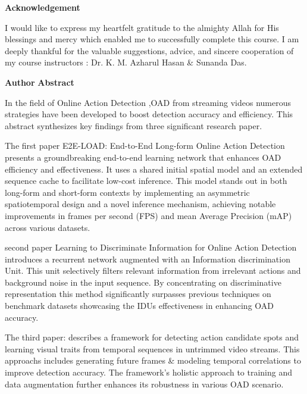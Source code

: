 \documentclass[12pt]{article}
\begin{document}
\begin{titlepage}
\begin{center}
{    {\fontsize{16}{1.5}\selectfont \textbf{Acknowledgement}}\\
    \vspace{12pt}
    \vspace{12pt}
    \begin{flushleft}
        \justifying  I would like to express my heartfelt gratitude to the almighty Allah for His blessings and
mercy which enabled me to successfully complete this course. I am deeply thankful for the
valuable suggestions, advice, and sincere cooperation of my course instructors : Dr. K. M.
Azharul Hasan \& Sunanda Das.
    \end{flushleft}
    {\fontsize{12}{1.5}\selectfont \hfill \textbf{Author}}
    \clearpage
    {\fontsize{16}{1.5}\selectfont \textbf{Abstract}}\\
    \vspace{12pt}
    \vspace{12pt}
    \begin{flushleft}
       
In the field of Online Action Detection ,OAD from streaming videos numerous strategies
have been developed to boost detection accuracy and efficiency. This abstract synthesizes
key findings from three significant research paper.
    \vspace{12pt}

The first paper E2E-LOAD: End-to-End Long-form Online Action Detection  presents a
groundbreaking end-to-end learning network that enhances OAD efficiency and
effectiveness. It uses a shared initial spatial model and an extended sequence cache to
facilitate low-cost inference. This model stands out in both long-form and short-form
contexts by implementing an asymmetric spatiotemporal design and a novel inference
mechanism, achieving notable improvements in frames per second (FPS) and mean Average
Precision (mAP) across various datasets.
    \vspace{12pt}

second paper Learning to Discriminate Information for Online Action Detection 
introduces a recurrent network augmented with an Information discrimination Unit.
This unit selectively filters relevant information from irrelevant actions and background
noise in the input sequence. By concentrating on discriminative representation this method
significantly surpasses previous techniques on benchmark datasets showcasing the IDUs
effectiveness in enhancing OAD accuracy.
    \vspace{12pt}

The third paper: describes a framework for detecting action candidate spots and learning
visual traits from temporal sequences in untrimmed video streams. This approachs includes
generating future frames \& modeling temporal correlations to improve detection accuracy.
The framework’s holistic approach to training and data augmentation further enhances its
robustness in various OAD scenario.
    \vspace{12pt}


\end{flushleft}}
\end{center}
\end{titlepage}
\end{document}

